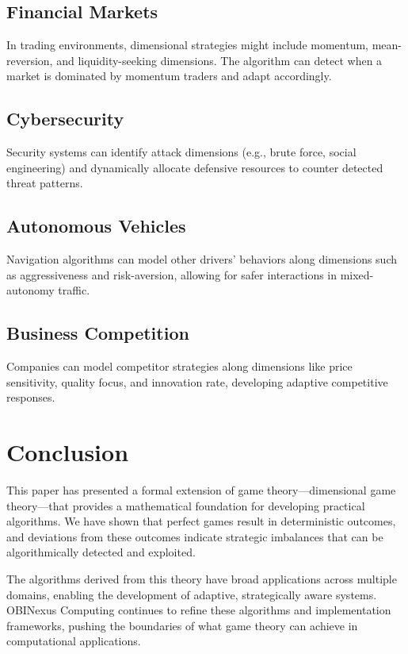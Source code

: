 \documentclass{article}
\begin{document}
\subsection{Financial Markets}

In trading environments, dimensional strategies might include momentum, mean-reversion, and liquidity-seeking dimensions. The algorithm can detect when a market is dominated by momentum traders and adapt accordingly.

\subsection{Cybersecurity}

Security systems can identify attack dimensions (e.g., brute force, social engineering) and dynamically allocate defensive resources to counter detected threat patterns.

\subsection{Autonomous Vehicles}

Navigation algorithms can model other drivers' behaviors along dimensions such as aggressiveness and risk-aversion, allowing for safer interactions in mixed-autonomy traffic.

\subsection{Business Competition}

Companies can model competitor strategies along dimensions like price sensitivity, quality focus, and innovation rate, developing adaptive competitive responses.

\section{Conclusion}

This paper has presented a formal extension of game theory—dimensional game theory—that provides a mathematical foundation for developing practical algorithms. We have shown that perfect games result in deterministic outcomes, and deviations from these outcomes indicate strategic imbalances that can be algorithmically detected and exploited.

The algorithms derived from this theory have broad applications across multiple domains, enabling the development of adaptive, strategically aware systems. OBINexus Computing continues to refine these algorithms and implementation frameworks, pushing the boundaries of what game theory can achieve in computational applications.
\end{document}
